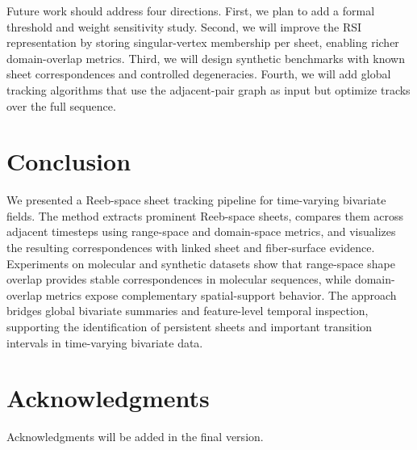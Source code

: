 Future work should address four directions. First, we plan to add a formal
threshold and weight sensitivity study. Second, we will improve the RSI
representation by storing singular-vertex membership per sheet, enabling richer
domain-overlap metrics. Third, we will design synthetic benchmarks with known
sheet correspondences and controlled degeneracies. Fourth, we will add global
tracking algorithms that use the adjacent-pair graph as input but optimize
tracks over the full sequence.

\section{Conclusion}

We presented a Reeb-space sheet tracking pipeline for time-varying bivariate
fields. The method extracts prominent Reeb-space sheets, compares them across
adjacent timesteps using range-space and domain-space metrics, and visualizes
the resulting correspondences with linked sheet and fiber-surface evidence.
Experiments on molecular and synthetic datasets show that range-space shape
overlap provides stable correspondences in molecular sequences, while
domain-overlap metrics expose complementary spatial-support behavior. The
approach bridges global bivariate summaries and feature-level temporal
inspection, supporting the identification of persistent sheets and important
transition intervals in time-varying bivariate data.

\section*{Acknowledgments}

Acknowledgments will be added in the final version.





